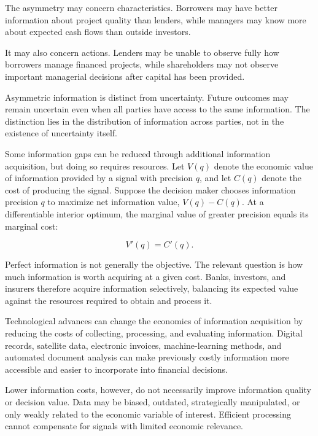 The asymmetry may concern characteristics. Borrowers may have better information about project quality than lenders, while managers may know more about expected cash flows than outside investors.

It may also concern actions. Lenders may be unable to observe fully how borrowers manage financed projects, while shareholders may not observe important managerial decisions after capital has been provided.

Asymmetric information is distinct from uncertainty. Future outcomes may remain uncertain even when all parties have access to the same information. The distinction lies in the distribution of information across parties, not in the existence of uncertainty itself.

Some information gaps can be reduced through additional information acquisition, but doing so requires resources. Let \(V(q)\) denote the economic value of information provided by a signal with precision \(q\), and let \(C(q)\) denote the cost of producing the signal.
Suppose the decision maker chooses information precision \(q\) to maximize net information value, \(V(q)-C(q)\). At a differentiable interior optimum, the marginal value of greater precision equals its marginal cost:

\begin{equation}
V'(q)=C'(q).
\label{eq:ch3-information-acquisition}
\end{equation}

Perfect information is not generally the objective. The relevant question is how much information is worth acquiring at a given cost. Banks, investors, and insurers therefore acquire information selectively, balancing its expected value against the resources required to obtain and process it.

Technological advances can change the economics of information acquisition by reducing the costs of collecting, processing, and evaluating information. Digital records, satellite data, electronic invoices, machine-learning methods, and automated document analysis can make previously costly information more accessible and easier to incorporate into financial decisions.

Lower information costs, however, do not necessarily improve information quality or decision value. Data may be biased, outdated, strategically manipulated, or only weakly related to the economic variable of interest. Efficient processing cannot compensate for signals with limited economic relevance.

